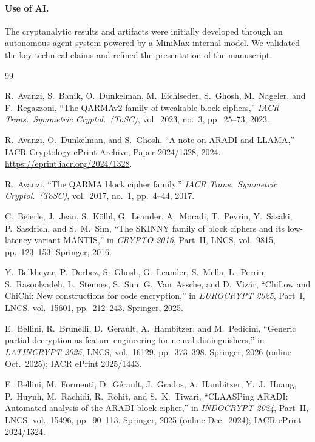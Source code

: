 \documentclass[11pt,a4paper]{article}
\theoremstyle{definition}
\theoremstyle{remark}
\begin{document}
\paragraph{Use of AI.}
The cryptanalytic results and artifacts were initially developed through an autonomous agent system powered by a MiniMax internal model. We validated the key technical claims and refined the presentation of the manuscript.

\begin{thebibliography}{99}
\small

R.~Avanzi, S.~Banik, O.~Dunkelman, M.~Eichlseder, S.~Ghosh, M.~Nageler, and F.~Regazzoni,
``The QARMAv2 family of tweakable block ciphers,''
\emph{IACR Trans.\ Symmetric Cryptol.\ (ToSC)}, vol.~2023, no.~3, pp.~25--73, 2023.

R.~Avanzi, O.~Dunkelman, and S.~Ghosh,
``A note on ARADI and LLAMA,''
IACR Cryptology ePrint Archive, Paper 2024/1328, 2024. \url{https://eprint.iacr.org/2024/1328}.

R.~Avanzi,
``The QARMA block cipher family,''
\emph{IACR Trans.\ Symmetric Cryptol.\ (ToSC)}, vol.~2017, no.~1, pp.~4--44, 2017.

C.~Beierle, J.~Jean, S.~K\"{o}lbl, G.~Leander, A.~Moradi, T.~Peyrin, Y.~Sasaki, P.~Sasdrich, and S.~M.~Sim,
``The SKINNY family of block ciphers and its low-latency variant MANTIS,''
in \emph{CRYPTO 2016}, Part~II, LNCS, vol.~9815, pp.~123--153. Springer, 2016.

Y.~Belkheyar, P.~Derbez, S.~Ghosh, G.~Leander, S.~Mella, L.~Perrin, S.~Rasoolzadeh, L.~Stennes, S.~Sun, G.~Van~Assche, and D.~Viz\'{a}r,
``ChiLow and ChiChi: New constructions for code encryption,''
in \emph{EUROCRYPT 2025}, Part~I, LNCS, vol.~15601, pp.~212--243. Springer, 2025.

E.~Bellini, R.~Brunelli, D.~Gerault, A.~Hambitzer, and M.~Pedicini,
``Generic partial decryption as feature engineering for neural distinguishers,''
in \emph{LATINCRYPT 2025}, LNCS, vol.~16129, pp.~373--398. Springer, 2026 (online Oct.~2025); IACR ePrint 2025/1443.

E.~Bellini, M.~Formenti, D.~G\'{e}rault, J.~Grados, A.~Hambitzer, Y.~J.~Huang, P.~Huynh, M.~Rachidi, R.~Rohit, and S.~K.~Tiwari,
``CLAASPing ARADI: Automated analysis of the ARADI block cipher,''
in \emph{INDOCRYPT 2024}, Part~II, LNCS, vol.~15496, pp.~90--113. Springer, 2025 (online Dec.~2024); IACR ePrint 2024/1324.


\end{thebibliography}
\end{document}
